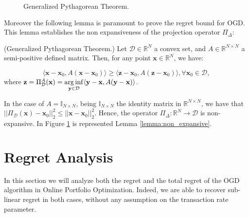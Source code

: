 \begin{figure}[ht!]
\centering

\caption{Generalized Pythagorean Theorem.}
\label{fig:pitagora}
\end{figure}

\vspace{1cm}

Moreover the following lemma is paramount to prove the regret bound for OGD. This lemma establishes the non expansiveness of the projection operator $\Pi_\Delta$:

\begin{lemma}(Generalized Pythagorean Theorem.)\label{lemma:non_expansive}
Let $\mathcal D\in\mathbb R^N$ a convex set, and $A\in\mathbb R^{N\times N}$ a semi-positive defined matrix. Then, for any point $\mathbf x\in\mathbb R^N$, we have:

\begin{equation}
\langle\mathbf x-\mathbf x_0,A(\mathbf x-\mathbf x_0) \rangle\ge\langle\mathbf z-\mathbf x_0,A(\mathbf z-\mathbf x_0)\rangle, \forall\mathbf x_0\in\mathcal D,
\end{equation}
where $\mathbf z=\Pi_{\mathcal D}^A(\mathbf x)=\operatorname*{arg\,inf}\limits_{\mathbf y\in\mathcal D}\langle\mathbf y-\mathbf x,A(\mathbf y-\mathbf x)\rangle$.
\end{lemma}

In the case of $A=\mathbb I_{N\times N}$, being $\mathbb I_{N\times N}$ the identity matrix in $\mathbb R^{N\times N}$, we have that $||\Pi_\mathcal D(\mathbf x)-\mathbf x_0||_2^2\le||\mathbf x-\mathbf x_0||_2^2$. Hence, the operator $\Pi_\Delta:\mathbb R^N\to\mathcal D$ is non-expansive. In Figure \ref{fig:pitagora} is represented Lemma \ref{lemma:non_expansive}.

\section{Regret Analysis}

In this section we will analyze both the regret and the total regret of the OGD algorithm in Online Portfolio Optimization. Indeed, we are able to recover sub-linear regret in both cases, without any assumption on the transaction rate parameter.


